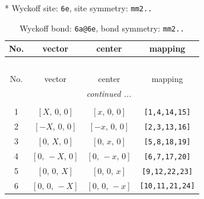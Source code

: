 \documentclass[fleqn,8pt]{jsarticle}
\begin{document}
* Wyckoff site: {\tt 6e}, site symmetry: {\tt mm2..}
\renewcommand{\arraystretch}{1.2}
\begin{longtable}{cccc}
\caption{Wyckoff bond: {\tt 6a@6e}, bond symmetry: {\tt mm2..}}
 \\
 \hline \hline
No. & vector & center & mapping \\ \hline \endfirsthead

\multicolumn{3}{l}{\tablename\ \thetable{}} \\
 \hline \hline
No. & vector & center & mapping \\ \hline \endhead

 \hline \hline
\multicolumn{3}{r}{\footnotesize\it continued ...} \\ \endfoot

 \hline \hline
\multicolumn{3}{r}{} \\ \endlastfoot

1 & $\left[ X,\, 0,\, 0 \right]$ & $\left[ x,\, 0,\, 0 \right]$ & {\tt [1,4,14,15]} \\ \hline
2 & $\left[ - X,\, 0,\, 0 \right]$ & $\left[ - x,\, 0,\, 0 \right]$ & {\tt [2,3,13,16]} \\ \hline
3 & $\left[ 0,\, X,\, 0 \right]$ & $\left[ 0,\, x,\, 0 \right]$ & {\tt [5,8,18,19]} \\ \hline
4 & $\left[ 0,\, - X,\, 0 \right]$ & $\left[ 0,\, - x,\, 0 \right]$ & {\tt [6,7,17,20]} \\ \hline
5 & $\left[ 0,\, 0,\, X \right]$ & $\left[ 0,\, 0,\, x \right]$ & {\tt [9,12,22,23]} \\ \hline
6 & $\left[ 0,\, 0,\, - X \right]$ & $\left[ 0,\, 0,\, - x \right]$ & {\tt [10,11,21,24]} \\
\end{longtable}
\renewcommand{\arraystretch}{1.2}
\end{document}
